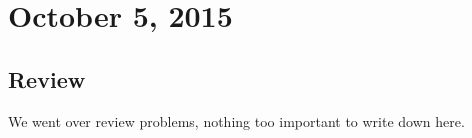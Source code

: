\section{October 5, 2015}
\subsection{Review}
We went over review problems, nothing too important to write down here.
